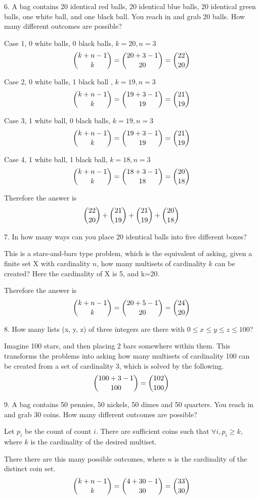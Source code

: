 \documentclass{hippoidC}
\begin{document}
\begin{prooflist}{6. A bag contains 20 identical red balls, 20 identical blue
    balls, 20 identical green balls, one white ball, and one black ball. You
reach in and grab 20 balls. How many different outcomes are possible?}
\item Case 1, 0 white balls, 0 black balls, $k=20, n=3$
    $$ \dbinom{k+n-1}{k} = \dbinom{20+3-1}{20}=\dbinom{22}{20}$$
\item Case 2, 0 white balls, 1 black ball , $k=19, n=3$
    $$ \dbinom{k+n-1}{k} = \dbinom{19+3-1}{19}=\dbinom{21}{19}$$
\item Case 3, 1 white ball, 0 black balls, $k=19, n=3$
    $$ \dbinom{k+n-1}{k} = \dbinom{19+3-1}{19}=\dbinom{21}{19}$$
\item Case 4, 1 white ball, 1 black ball, $k=18, n=3$
    $$ \dbinom{k+n-1}{k} = \dbinom{18+3-1}{18}=\dbinom{20}{18}$$
\item Therefore the answer is
    $$ \dbinom{22}{20} +\dbinom{21}{19} +\dbinom{21}{19} +\dbinom{20}{18}$$
\end{prooflist}

\begin{prooflist}{7. In how many ways can you place 20 identical balls into five
    different boxes?}
\item This is a stars-and-bars type problem, which is the equivalent of asking,
    given a finite set X with cardinality $n$, how many multisets of cardinality
    $k$ can be created? Here the cardinality of X is 5, and k=20.
\item Therefore the answer is
    $$ \dbinom{k+n-1}{k} = \dbinom{20+5-1}{20}=\dbinom{24}{20}$$
\end{prooflist}

\begin{prooflist}{8. How many lists (x, y, z) of three integers are there with
    $0 \leq x \leq y \leq z \leq 100$?}
\item  Imagine 100 stars, and then placing 2 bars somewhere within them. This
    transforms the problems into asking how many multisets of cardinality 100
    can be created from a set of cardinality 3, which is solved by the
    following.
    $$ \dbinom{100+3-1}{100} = \dbinom{102}{100}$$
\item
\end{prooflist}

\begin{prooflist}{9. A bag contains 50 pennies, 50 nickels, 50 dimes and 50 quarters. You reach in and grab 30 coins. How many different outcomes are possible?}
\item Let $p_i$ be the count of count $i$. There are sufficient coins such that
    $\forall i, p_i\geq k$, where $k$ is the cardinality of the desired
    multiset.
\item There there are this many possible outcomes, where $n$ is the cardinality
    of the distinct coin set.
    $$ \dbinom{k+n-1}{k} = \dbinom{4+30-1}{30}=\dbinom{33}{30}$$
\end{prooflist}
\end{document}
